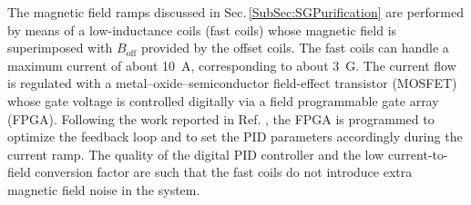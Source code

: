 The magnetic field ramps discussed in Sec.\,\ref{SubSec:SGPurification} are performed by means of a low-inductance coils ({fast coils}) whose magnetic field is superimposed with $B_{\textrm{off}}$ provided by the offset coils. The fast coils can handle a maximum current of about \SI{10}{\ampere}, corresponding to about \SI{3}{ G}. The current flow is regulated with a metal–oxide–semiconductor field-effect transistor (MOSFET) whose gate voltage is controlled digitally via a field programmable gate array (FPGA). Following the work reported in Ref. \cite{Thomas2020adf}, the FPGA is programmed to optimize the feedback loop and to set the PID parameters accordingly during the current ramp. The quality of the digital PID controller and the low current-to-field conversion factor are such that the {fast coils} do not introduce extra magnetic field noise in the system. 